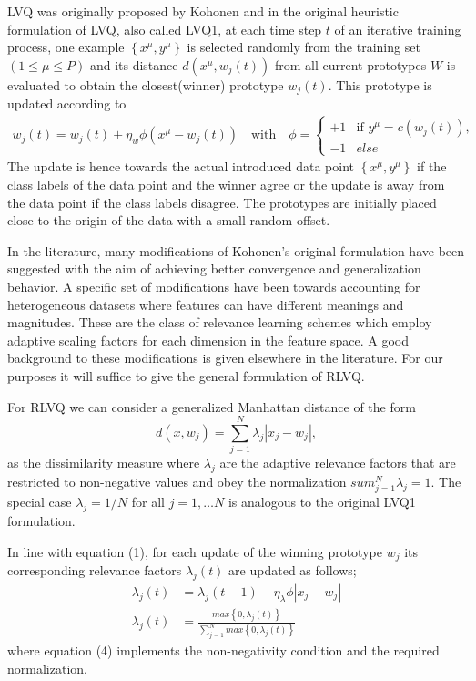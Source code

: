 \documentclass{esannV2}
\begin{document}
LVQ was originally proposed by Kohonen and in the original heuristic formulation of LVQ, also called LVQ1\cite{02}, at each time step $t$ of an iterative training process, one example $\left\{x^\mu, y^\mu\right\}$ is selected randomly from the training set $(1 \leq \mu \leq P)$ and its distance $d(x^\mu,w_j(t))$  from all current prototypes $W$ is evaluated to obtain the closest(winner) prototype $w_j(t)$. This prototype is updated according to
%
\begin{align} 
w_j(t) = w_j(t) + \eta_w \phi (x^\mu - w_j(t)) \quad \text{with} \quad
\phi = \begin{cases}
+1& \text{if $y^\mu = c(w_j(t))$},\\
-1& else 
\end{cases}
\end{align}
%
The update is hence towards the actual introduced data point $\left\{x^\mu, y^\mu\right\}$ if the class labels of the data point and the winner agree or the update is away from the data point if the class labels disagree. The prototypes are initially placed close to the origin of the data with a small random offset.

In the literature, many modifications of Kohonen's original formulation have been suggested with the aim of achieving better convergence and generalization behavior. A specific set of modifications have been towards accounting for heterogeneous datasets where features can have different meanings and magnitudes. These are the class of relevance learning schemes which employ adaptive scaling factors for each dimension in the feature space. A good background to these modifications is given elsewhere in the literature\cite{09,10,11}. For our purposes it will suffice to give the general formulation of RLVQ.

For RLVQ we can consider a generalized Manhattan distance of the form
%
\begin{equation} 
d(x,w_j) = \sum^N_{j=1} \lambda_j |x_j - w_j| ,
\end{equation}
%
as the dissimilarity measure where $\lambda_j$ are the adaptive relevance factors that are restricted to non-negative values and obey the normalization $sum^N_{j=1} \lambda_j = 1$. The special case $\lambda_j = 1/N$ for all $j = 1,\ldots N$ is analogous to the original LVQ1 formulation.

In line with equation (1), for each update of the winning prototype $w_j$ its corresponding relevance factors $\lambda_j(t)$ are updated as follows;
%
\begin{align}
\lambda_j(t) &= \lambda_j(t-1) - \eta_\lambda \phi |x_j - w_j| \\
\lambda_j(t) &= \frac{max\left\{0,\lambda_j(t)\right\}}{\sum^N_{j=1} max\left\{0,\lambda_j(t)\right\}}
\end{align}
%
where equation (4) implements the non-negativity condition and the required normalization.
\end{document}
